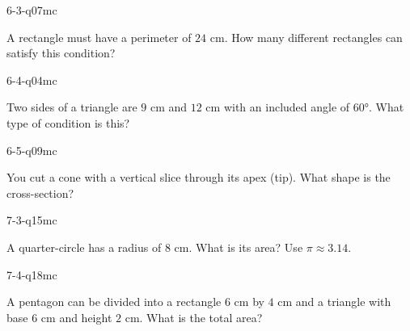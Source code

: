 \begin{practiceQuestion}{6-3-q07}{mc}
\begin{questionText}
A rectangle must have a perimeter of $24$ cm. How many different rectangles can satisfy this condition?
\end{questionText}
\end{practiceQuestion}

\begin{practiceQuestion}{6-4-q04}{mc}
\begin{questionText}
Two sides of a triangle are $9$ cm and $12$ cm with an included angle of $60°$. What type of condition is this?
\end{questionText}
\end{practiceQuestion}

\begin{practiceQuestion}{6-5-q09}{mc}
\begin{questionText}
You cut a cone with a vertical slice through its apex (tip). What shape is the cross-section?
\end{questionText}
\end{practiceQuestion}

\begin{practiceQuestion}{7-3-q15}{mc}
\begin{questionText}
A quarter-circle has a radius of $8$ cm. What is its area? Use $\pi \approx 3.14$.
\end{questionText}
\end{practiceQuestion}

\begin{practiceQuestion}{7-4-q18}{mc}
\begin{questionText}
A pentagon can be divided into a rectangle $6$ cm by $4$ cm and a triangle with base $6$ cm and height $2$ cm. What is the total area?
\end{questionText}
\end{practiceQuestion}

